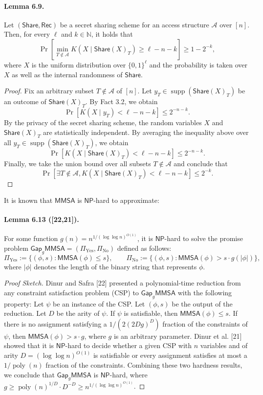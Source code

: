 \paragraph{Lemma 6.9.}
Let $(\mathsf{Share},\mathsf{Rec})$ be a secret sharing scheme for an access structure $\mathcal A$ over $[n]$. Then, for every $\ell$ and $k\in\mathbb N$, it holds that
\[\Pr\left[\min_{T\notin\mathcal A}K(X\mid\mathsf{Share}(X)_T)\geq\ell-n-k\right]\geq1-2^{-k},\]
where $X$ is the uniform distribution over $\{0,1\}^\ell$ and the probability is taken over $X$ as well as the internal randomness of $\mathsf{Share}$.
\begin{proof}
Fix an arbitrary subset $T\notin\mathcal A$ of $[n]$. Let $y_T\in\operatorname{supp}(\mathsf{Share}(X)_T)$ be an outcome of $\mathsf{Share}(X)_T$. By Fact 3.2, we obtain
\[\Pr[K(X\mid y_T)<\ell-n-k]\leq2^{-n-k}.\]
By the privacy of the secret sharing scheme, the random variables $X$ and $\mathsf{Share}(X)_T$ are statistically independent. By averaging the inequality above over all $y_T\in\operatorname{supp}(\mathsf{Share}(X)_T)$, we obtain
\[\Pr[K(X\mid\mathsf{Share}(X)_T)<\ell-n-k]\leq2^{-n-k}.\]
Finally, we take the union bound over all subsets $T\notin\mathcal A$ and conclude that
\[\Pr[\exists T\notin\mathcal A,K(X\mid\mathsf{Share}(X)_T)<\ell-n-k]\leq2^{-k}.\]
\end{proof}
It is known that $\mathsf{MMSA}$ is $\mathsf{NP}$-hard to approximate:
\paragraph{Lemma 6.13 ([22,21]).}
For some function $g(n)=n^{1/(\log\log n)^{O(1)}}$, it is $\mathsf{NP}$-hard to solve the promise problem $\mathsf{Gap}_g\mathsf{MMSA}=(\Pi_{\mathrm{Yes}},\Pi_{\mathrm{No}})$ defined as follows:
\[\Pi_{\mathrm{Yes}}:=\{(\phi,s):\mathsf{MMSA}(\phi)\leq s\},\qquad\Pi_{\mathrm{No}}:=\{(\phi,s):\mathsf{MMSA}(\phi)>s\cdot g(|\phi|)\},\]
where $|\phi|$ denotes the length of the binary string that represents $\phi$.
\begin{proof}[Proof Sketch]
Dinur and Safra [22] presented a polynomial-time reduction from any constraint satisfaction problem (CSP) to $\mathsf{Gap}_g\mathsf{MMSA}$ with the following property: Let $\psi$ be an instance of the CSP. Let $(\phi,s)$ be the output of the reduction. Let $D$ be the arity of $\psi$. If $\psi$ is satisfiable, then $\mathsf{MMSA}(\phi)\leq s$. If there is no assignment satisfying a $1/(2(2Dg)^D)$ fraction of the constraints of $\psi$, then $\mathsf{MMSA}(\phi)>s\cdot g$, where $g$ is an arbitrary parameter. Dinur et al. [21] showed that it is $\mathsf{NP}$-hard to decide whether a given CSP with $n$ variables and of arity $D=(\log\log n)^{O(1)}$ is satisfiable or every assignment satisfies at most a $1/\operatorname{poly}(n)$ fraction of the constraints. Combining these two hardness results, we conclude that $\mathsf{Gap}_g\mathsf{MMSA}$ is $\mathsf{NP}$-hard, where $g\geq\operatorname{poly}(n)^{1/D}\cdot D^{-D}\geq n^{1/(\log\log n)^{O(1)}}$.
\end{proof}

